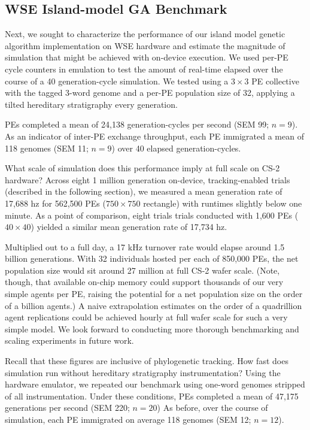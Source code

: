 \subsection{WSE Island-model GA Benchmark}

Next, we sought to characterize the performance of our island model genetic algorithm implementation on WSE hardware and estimate the magnitude of simulation that might be achieved with on-device execution.
We used per-PE cycle counters in emulation to test the amount of real-time elapsed over the course of a 40 generation-cycle simulation.
We tested using a $3\times3$ PE collective with the tagged 3-word genome and a per-PE population size of 32, applying a tilted hereditary stratigraphy every generation.

PEs completed a mean of 24,138 generation-cycles per second (SEM 99; $n=9$).
As an indicator of inter-PE exchange throughput, each PE immigrated a mean of 118 genomes (SEM 11; $n=9$) over 40 elapsed generation-cycles.

What scale of simulation does this performance imply at full scale on CS-2 hardware?
Across eight 1 million generation on-device, tracking-enabled trials (described in the following section), we measured a mean generation rate of 17,688 hz for 562,500 PEs ($750\times750$ rectangle) with runtimes slightly below one minute.
As a point of comparison, eight trials trials conducted with 1,600 PEs ($40\times40$) yielded a similar mean generation rate of 17,734 hz.

Multiplied out to a full day, a 17 kHz turnover rate would elapse around 1.5 billion generations.
With 32 individuals hosted per each of 850,000 PEs, the net population size would sit around 27 million at full CS-2 wafer scale.
(Note, though, that available on-chip memory could support thousands of our very simple agents per PE, raising the potential for a net population size on the order of a billion agents.)
A naive extrapolation estimates on the order of a quadrillion agent replications could be achieved hourly at full wafer scale for such a very simple model.
We look forward to conducting more thorough benchmarking and scaling experiments in future work.

Recall that these figures are inclusive of phylogenetic tracking.
How fast does simulation run without hereditary stratigraphy instrumentation?
Using the hardware emulator, we repeated our benchmark using one-word genomes stripped of all instrumentation.
Under these conditions, PEs completed a mean of 47,175 generations per second (SEM 220; $n=20$)
As before, over the course of simulation, each PE immigrated on average 118 genomes (SEM 12; $n=12$).

